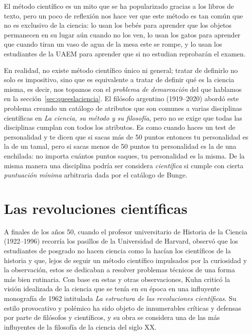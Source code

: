 El método científico es un mito que se ha popularizado gracias a los libros de
texto, pero un poco de reflexión nos hace ver que este método es tan común que
no es exclusivo de la ciencia: lo usan los bebés para aprender que los objetos
permanecen en su lugar aún cuando no los ven, lo usan los gatos para aprender
que cuando tiran un vaso de agua de la mesa este se rompe, y lo usan los
estudiantes de la UAEM para aprender que si no estudian reprobarán el examen.

En realidad, no existe método científico único ni general; tratar de definirlo
no solo es impositivo, sino que es equivalente a tratar de definir qué es la
ciencia misma, es decir, nos topamos con el \emph{problema de demarcación} del
que hablamos en la sección~\ref{sec:queeslaciencia}.
El filósofo argentino  (1919--2020) abordó este
problema creando un catálogo de atributos que son comunes a varias disciplinas
científicas en \emph{La ciencia, su método y su filosofía}\cite{Bunge1996}, pero
no se exige que todas las disciplinas cumplan con todos los atributos.
Es como cuando haces un test de personalidad y te dicen que si sacas más de 50
puntos entonces tu personalidad es la de un tamal, pero si sacas menos de 50
puntos tu personalidad es la de una enchilada: no importa cuántos puntos saques,
tu personalidad es la misma.
De la misma manera una disciplina podría ser considera \emph{científica} si
cumple con cierta \emph{puntuación mínima} arbitraria dada por el catálogo de
Bunge.

\section{Las revoluciones científicas}
\label{sec:lasrevolucionescientificas}
A finales de los años 50, cuando el profesor universitario de Historia de la
Ciencia  (1922--1996) recorría los pasillos de
la Universidad de Harvard, observó que los estudiantes de posgrado no hacen
ciencia como la hacían los científicos de la historia y que, lejos de seguir un
método científico impulsados por la curiosidad y la observación, estos se
dedicaban a resolver problemas técnicos de una forma más bien rutinaria.
Con base en estas y otras observaciones, Kuhn criticó la visión idealizada de la
ciencia que se tenía en su época en una influyente monografía de 1962
intitulada \emph{La estructura de las revoluciones científicas}\cite{Kuhn2005}.
Su estilo provocativo y polémico ha sido objeto de innumerables críticas y
defensas por parte de filósofos y científicos, y su obra se considera una de
las más influyentes de la filosofía de la ciencia del siglo XX.

